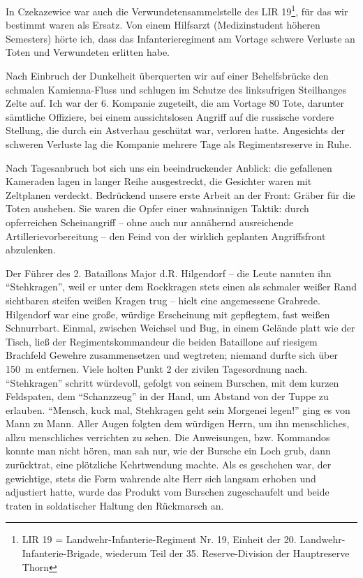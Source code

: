 \documentclass[a5paper,pagesize,10pt,twoside=true]{scrbook}
\renewcommand{\marginpar}[2][]{}
\begin{document}
In Czekazewice war auch die Verwundetensammelstelle des LIR 19\footnote{LIR 19 = Landwehr-Infanterie-Regiment Nr. 19, Einheit der 20. Landwehr-Infanterie-Brigade, wiederum Teil der 35. Reserve-Division der Hauptreserve Thorn}, für das wir bestimmt waren als Ersatz. Von einem Hilfsarzt (Medizinstudent höheren Semesters) hörte ich, dass das Infanterieregiment am Vortage schwere Verluste an Toten und Verwundeten erlitten habe.

Nach Einbruch der Dunkelheit überquerten wir auf einer Behelfsbrücke den schmalen Kamienna-Fluss und schlugen im Schutze des linksufrigen Steilhanges Zelte auf. Ich war der 6. Kompanie zugeteilt, die am Vortage 80 Tote, darunter sämtliche Offiziere, bei einem aussichtslosen Angriff auf die russische vordere Stellung, die durch ein Astverhau geschützt war, verloren hatte. Angesichts der schweren Verluste lag die Kompanie mehrere Tage als Regimentsreserve in Ruhe.

Nach Tagesanbruch bot sich uns ein beeindruckender Anblick: die gefallenen Kameraden lagen in langer Reihe ausgestreckt, die Gesichter waren mit Zeltplanen verdeckt. Bedrückend unsere erste Arbeit an der Front: Gräber für die Toten ausheben. Sie waren die Opfer einer wahnsinnigen Taktik: durch opferreichen Scheinangriff -- ohne auch nur annähernd ausreichende Artillerievorbereitung -- den Feind von der wirklich geplanten Angriffsfront abzulenken.

Der Führer des 2. Bataillons Major d.R. Hilgendorf -- die Leute nannten ihn \enquote{Stehkragen}, weil er unter dem Rockkragen stets einen als schmaler weißer Rand sichtbaren steifen weißen Kragen trug -- hielt eine angemessene Grabrede. Hilgendorf war eine große, würdige Erscheinung mit gepflegtem, fast weißen Schnurrbart. Einmal, zwischen Weichsel und Bug, in einem Gelände platt wie der Tisch, ließ der Regimentskommandeur die beiden Bataillone auf riesigem Brachfeld Gewehre zusammensetzen und wegtreten; niemand durfte sich über 150~m entfernen. Viele holten Punkt 2 der zivilen Tagesordnung nach. \enquote{Stehkragen} schritt würdevoll, gefolgt von seinem Burschen, mit dem kurzen Feldspaten, dem \enquote{Schanzzeug} in der Hand, um Abstand von der Tuppe zu erlauben. \enquote{Mensch, kuck mal, Stehkragen geht sein Morgenei legen!} ging es von Mann zu Mann. Aller Augen folgten dem würdigen Herrn, um ihn menschliches, allzu menschliches verrichten zu sehen. Die Anweisungen, bzw. Kommandos konnte man nicht hören, man sah nur, wie der Bursche ein Loch grub, dann zurücktrat, eine plötzliche Kehrtwendung machte. Als es geschehen war, der gewichtige, stets die Form wahrende alte Herr sich langsam erhoben und adjustiert hatte, wurde das Produkt vom Burschen zugeschaufelt und beide traten in soldatischer Haltung den Rückmarsch an.
\marginpar{Heft 1 beendet 17.4.1998}
\end{document}
